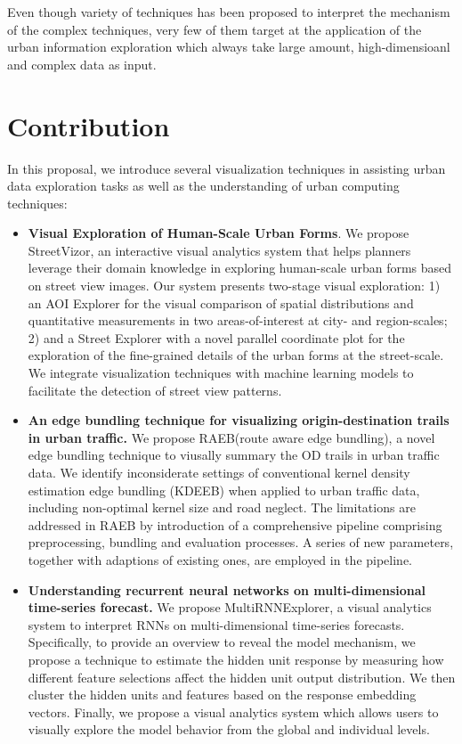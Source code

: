Even though variety of techniques has been proposed to interpret the mechanism of the complex techniques, very few of them target at the application of the urban information exploration which always take large amount, high-dimensioanl and complex data as input.  

\section{Contribution}
In this proposal, we introduce several visualization techniques in assisting urban data exploration tasks as well as the understanding of urban computing techniques:

\begin{itemize}[noitemsep]
	\item \textbf{Visual Exploration of Human-Scale Urban Forms}. We propose StreetVizor, an interactive visual analytics system that helps planners leverage their domain knowledge in exploring human-scale urban forms based on street view images. Our system presents two-stage visual exploration: 1) an AOI Explorer for the visual comparison of spatial distributions and quantitative measurements in two areas-of-interest at city- and region-scales; 2) and a Street Explorer with a novel parallel coordinate plot for the exploration of the fine-grained details of the urban forms at the street-scale. We integrate visualization techniques with machine learning models to facilitate the detection of street view patterns. 
	\item \textbf{An edge bundling technique for visualizing origin-destination trails in urban traffic.} We propose RAEB(route aware edge bundling), a novel edge bundling technique to viusally summary the OD trails in urban traffic data. We identify inconsiderate settings of conventional kernel density estimation edge bundling (KDEEB) when applied to urban traffic data, including non-optimal kernel size and road neglect. The limitations are addressed in RAEB by introduction of a comprehensive pipeline comprising preprocessing, bundling and evaluation processes. A series of new parameters, together with adaptions of existing ones, are employed in the pipeline. 
	\item \textbf{Understanding recurrent neural networks on multi-dimensional time-series forecast.} We propose MultiRNNExplorer, a visual analytics system to interpret RNNs on multi-dimensional time-series forecasts.  
	Specifically, to provide an overview to reveal the model mechanism, we propose a technique to estimate the hidden unit response by measuring how different feature selections affect the hidden unit output distribution. 
	We then cluster the hidden units and features based on the response embedding vectors. 
	Finally, we propose a visual analytics system which allows users to visually explore the model behavior from the global and individual levels.
\end{itemize}


